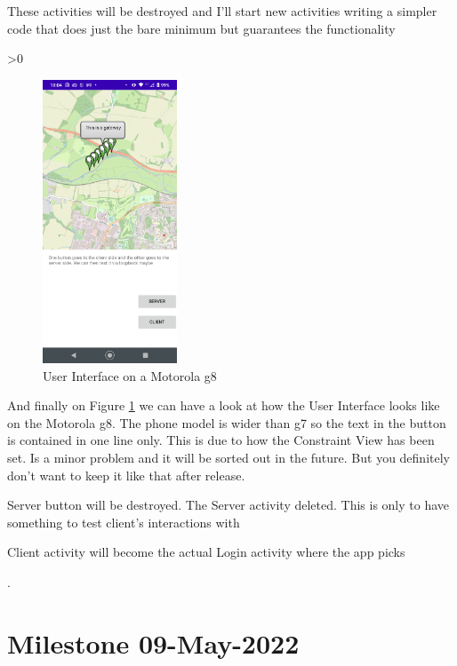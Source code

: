 \documentclass[a4paper,12pt]{book}
\makeatletter
\newcommand{\wrapfill}{\par\ifnum\value{WF@wrappedlines}>0
  \addtocounter{WF@wrappedlines}{-1}%
  \null\vspace{\arabic{WF@wrappedlines}\baselineskip}%
  \WFclear
\fi}
\makeatother
\begin{document}
These activities will be destroyed and I'll start new activities writing a simpler code that does just the bare minimum but guarantees the functionality
\wrapfill


\clearpage  

\begin{figure}
\centering
\includegraphics[width=4cm]{./current_status_g8.PNG}
\caption{User Interface on a Motorola g8}\label{fig:User-Interface-g8}
\end{figure}






And finally on Figure \ref{fig:User-Interface-g8} we can have a look at how the User Interface looks like on the Motorola g8. The phone model is wider than g7 so the text in the button is contained in one line only. This is due to how the Constraint View has been set. Is a minor problem and it will be sorted out in the future. But you definitely don't want to keep it like that after release.

Server button will be destroyed. The Server activity deleted. This is only to have something to test client's interactions with

Client activity will become the actual Login activity where the app picks

\clearpage
. 
\bigskip
\bigskip
\bigskip
\bigskip
\bigskip
\bigskip
\bigskip
\bigskip
\bigskip
\bigskip
\bigskip
\bigskip
\bigskip
\bigskip
\bigskip
\medskip
\medskip
\medskip
\section{\scalebox{1.5}Milestone 09-May-2022}
\end{document}
